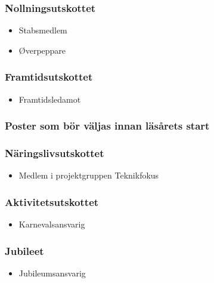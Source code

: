 \documentclass{dsekprotokoll}
\begin{document}
\begin{multicols}{2}
    \subsubsection*{Nollningsutskottet}
    \begin{itemize}
        \item Stabsmedlem
        \item Øverpeppare
    \end{itemize}

    \subsubsection*{Framtidsutskottet}
    \begin{itemize}
        \item Framtidsledamot
    \end{itemize}
\end{multicols}

\subsubsection*{Poster som bör väljas innan läsårets start}

\begin{multicols}{2}
    \subsubsection*{Näringslivsutskottet}
    \begin{itemize}
        \item Medlem i projektgruppen Teknikfokus
    \end{itemize}

    \subsubsection*{Aktivitetsutskottet}
    \begin{itemize}
        \item Karnevalsansvarig
    \end{itemize}

    \subsubsection*{Jubileet}
    \begin{itemize}
        \item Jubileumsansvarig
    \end{itemize}

\end{multicols}
\end{document}
